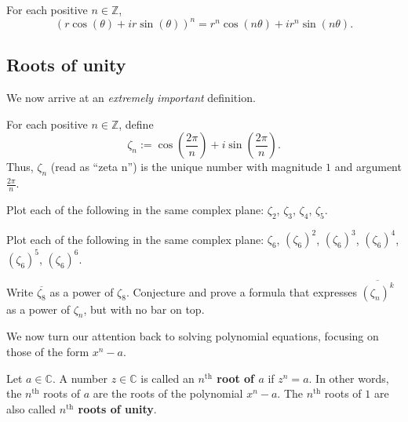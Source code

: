 \begin{corollary}\label{cor.DeMoivre}
For each positive $n\in \mathbb{Z}$, \[\left(r\cos(\theta) + ir\sin(\theta)\right)^n = r^n\cos(n\theta) + ir^n\sin(n\theta).\]
\end{corollary}

\subsection{Roots of unity}
We now arrive at an \emph{extremely important} definition.

\begin{definition}
For each positive $n\in \mathbb{Z}$, define \[\zeta_n := \cos\left(\frac{2\pi}{n}\right) + i\sin\left(\frac{2\pi}{n}\right).\]
Thus, $\zeta_n$ (read as ``zeta n'') is the unique  number with magnitude $1$ and argument $\frac{2\pi}{n}$.
\end{definition}

\begin{problem}
Plot each of the following in the same complex plane: $\zeta_2$, $\zeta_3$, $\zeta_4$, $\zeta_5$.
\end{problem}

\begin{problem}
Plot each of the following in the same complex plane: $\zeta_6$, $(\zeta_6)^2$, $(\zeta_6)^3$, $(\zeta_6)^4$, $(\zeta_6)^5$, $(\zeta_6)^6$.
\end{problem}

\begin{problem}
Write $\overline{\zeta_8}$ as a power of $\zeta_8$. Conjecture and prove a formula that expresses $\overline{(\zeta_n)^k}$ as a power of $\zeta_n$, but with no bar on top.
\end{problem}

We now turn our attention back to solving polynomial equations, focusing on those of the form $x^n - a$.

\begin{definition}\label{def.nthRoot}
Let $a\in \mathbb{C}$. A number $z\in \mathbb{C}$ is called an \textbf{$n^\text{th}$ root of $a$} if $z^n = a$. In other words, the  $n^\text{th}$ roots of $a$ are the roots of the polynomial $x^n-a$. The  $n^\text{th}$ roots of $1$ are also called \textbf{$n^\text{th}$ roots of unity}.
\end{definition}

